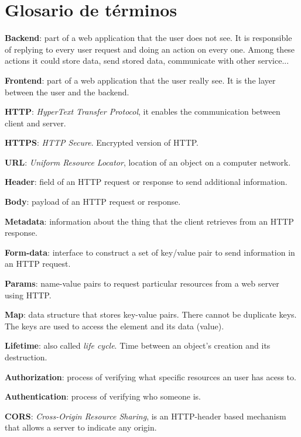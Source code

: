 \chapter{Glosario de términos}

\textbf{Backend}: part of a web application that the user does not see. It is responsible of replying to every user request and doing an action on every one. Among these actions it could store data, send stored data, communicate with other service...
\bigskip

\textbf{Frontend}: part of a web application that the user really see. It is the layer between the user and the backend.
\bigskip

\textbf{HTTP}: \textit{HyperText Transfer Protocol}, it enables the communication between client and server. 
\bigskip

\textbf{HTTPS}: \textit{HTTP Secure}. Encrypted version of HTTP.
\bigskip

\textbf{URL}: \textit{Uniform Resource Locator}, location of an object on a computer network.
\bigskip

\textbf{Header}: field of an HTTP request or response to send additional information.
\bigskip

\textbf{Body}: payload of an HTTP request or response.
\bigskip

\textbf{Metadata}: information about the thing that the client retrieves from an HTTP response.
\bigskip

\textbf{Form-data}: interface to construct a set of key/value pair to send information in an HTTP request.
\bigskip

\textbf{Params}: name-value pairs to request particular resources from a web server using HTTP.
\bigskip

\textbf{Map}: data structure that stores key-value pairs. There cannot be duplicate keys. The keys are used to access the element and its data (value).
\bigskip

\textbf{Lifetime}: also called \textit{life cycle}. Time between an object's creation and its destruction.
\bigskip

\textbf{Authorization}: process of verifying what specific resources an user has acess to.
\bigskip

\textbf{Authentication}: process of verifying who someone is.
\bigskip

\textbf{CORS}: \textit{Cross-Origin Resource Sharing}, is an HTTP-header based mechanism that allows a server to indicate any origin.
\bigskip

